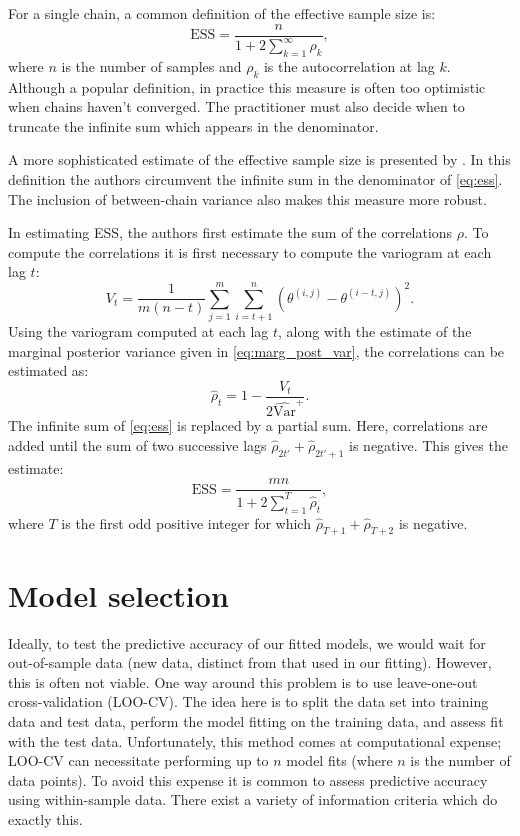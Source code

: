 For a single chain, a common definition of the effective sample size is:
\begin{equation}
    \label{eq:ess}
    \text{ESS} = \frac{n}{1 + 2 \sum_{k=1}^\infty \rho_k},
\end{equation}
where $n$ is the number of samples and $\rho_k$ is the autocorrelation at lag
$k$. Although a popular definition, in practice this measure is often too
optimistic when chains haven't converged. The practitioner must also decide
when to truncate the infinite sum which appears in the denominator.

A more sophisticated estimate of the effective sample size is presented by
\textcite{gelman13}. In this definition the authors circumvent the infinite sum
in the denominator of \cref{eq:ess}. The inclusion of between-chain variance
also makes this measure more robust.

In estimating ESS, the authors first estimate the sum of the correlations
$\rho$. To compute the correlations it is first necessary to compute the
variogram at each lag $t$:
\begin{equation*}
    V_t = \frac{1}{m(n-t)} \sum_{j=1}^m \sum_{i=t+1}^{n} (\theta^{(i, j)} -
    \theta^{(i-t,j)})^2.
\end{equation*}
Using the variogram computed at each lag $t$, along with the estimate of the
marginal posterior variance given in \cref{eq:marg_post_var}, the correlations
can be estimated as:
\begin{equation*}
  \widehat{\rho}_t = 1 - \frac{V_t}{2\widehat{\text{Var}}^+}.
\end{equation*}
The infinite sum of \cref{eq:ess} is replaced by a partial sum. Here,
correlations are added until the sum of two successive lags
$\widehat{\rho}_{2t'} + \widehat{\rho}_{2t'+1}$ is negative. This gives the
estimate:
\begin{equation*}
  \text{ESS} = \frac{mn}{1+ 2\sum_{t=1}^{T}\widehat{\rho}_t},
\end{equation*}
where $T$ is the first odd positive integer for which $\widehat{\rho}_{T+1} +
\widehat{\rho}_{T+2}$ is negative.

\section{Model selection}
\label{sec:model_comparison}

Ideally, to test the predictive accuracy of our fitted models, we would wait
for out-of-sample data (new data, distinct from that used in our fitting).
However, this is often not viable. One way around this problem is to use
leave-one-out cross-validation (LOO-CV). The idea here is to split the data set
into training data and test data, perform the model fitting on the training
data, and assess fit with the test data. Unfortunately, this method comes at
computational expense; LOO-CV can necessitate performing up to $n$ model fits
(where $n$ is the number of data points). To avoid this expense it is common to
assess predictive accuracy using within-sample data. There exist a variety of
information criteria which do exactly this.


